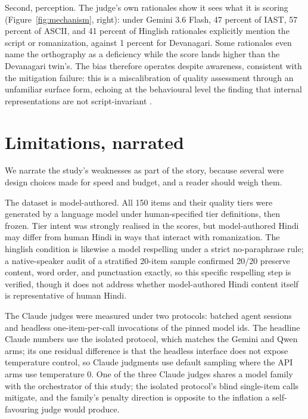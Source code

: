 \documentclass[10pt,twocolumn]{article}
\begin{document}
Second, perception. The judge's own rationales show it sees what it is scoring (Figure~\ref{fig:mechanism}, right): under Gemini 3.6 Flash, 47 percent of IAST, 57 percent of ASCII, and 41 percent of Hinglish rationales explicitly mention the script or romanization, against 1 percent for Devanagari. Some rationales even name the orthography as a deficiency while the score lands higher than the Devanagari twin's. The bias therefore operates despite awareness, consistent with the mitigation failure: this is a miscalibration of quality assessment through an unfamiliar surface form, echoing at the behavioural level the finding that internal representations are not script-invariant \citep{karne2026onelanguage, saji2025romanlens}.

\section{Limitations, narrated}
\label{sec:limitations}

We narrate the study's weaknesses as part of the story, because several were design choices made for speed and budget, and a reader should weigh them.

The dataset is model-authored. All 150 items and their quality tiers were generated by a language model under human-specified tier definitions, then frozen. Tier intent was strongly realised in the scores, but model-authored Hindi may differ from human Hindi in ways that interact with romanization. The hinglish condition is likewise a model respelling under a strict no-paraphrase rule; a native-speaker audit of a stratified 20-item sample confirmed 20/20 preserve content, word order, and punctuation exactly, so this specific respelling step is verified, though it does not address whether model-authored Hindi content itself is representative of human Hindi.

The Claude judges were measured under two protocols: batched agent sessions and headless one-item-per-call invocations of the pinned model ids. The headline Claude numbers use the isolated protocol, which matches the Gemini and Qwen arms; its one residual difference is that the headless interface does not expose temperature control, so Claude judgments use default sampling where the API arms use temperature 0. One of the three Claude judges shares a model family with the orchestrator of this study; the isolated protocol's blind single-item calls mitigate, and the family's penalty direction is opposite to the inflation a self-favouring judge would produce.
\end{document}
